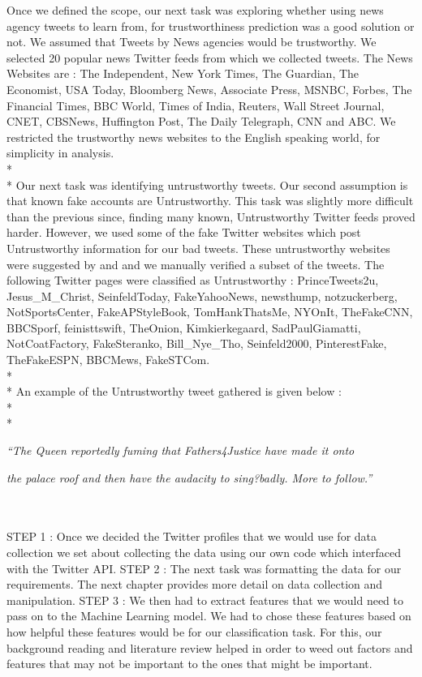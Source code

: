 Once we defined the scope, our next task was exploring whether using news agency tweets to learn from, for trustworthiness prediction was a good solution or not. 
We assumed that Tweets by News agencies would be trustworthy. We selected 20 popular news Twitter feeds from which we collected tweets. The News Websites are : The Independent, New York Times, The Guardian, The Economist, USA Today, Bloomberg News, Associate Press, MSNBC, Forbes, The Financial Times, BBC World, Times of India, Reuters, Wall Street Journal, CNET, CBSNews, Huffington Post, The Daily Telegraph, CNN and ABC. We restricted the trustworthy news websites to the English speaking world, for simplicity in analysis.\\*\\*
Our next task was identifying untrustworthy tweets.  Our second assumption is that known fake accounts are Untrustworthy. This task was slightly more difficult than the previous since, finding many known, Untrustworthy Twitter feeds proved harder. However, we used some of the fake Twitter websites which post Untrustworthy information for our bad tweets. These untrustworthy websites were suggested by \cite{23} and \cite{24} and we manually verified a subset of the tweets. The following Twitter pages were classified as Untrustworthy : PrinceTweets2u, Jesus\_M\_Christ, SeinfeldToday, FakeYahooNews, newsthump, notzuckerberg, NotSportsCenter, FakeAPStyleBook, TomHankThatsMe, NYOnIt, TheFakeCNN, BBCSporf, feinisttswift, TheOnion, Kimkierkegaard, SadPaulGiamatti, NotCoatFactory, FakeSteranko, Bill\_Nye\_Tho, Seinfeld2000, PinterestFake, TheFakeESPN, BBCMews, FakeSTCom. \\*\\* An example of the Untrustworthy tweet gathered is given below : \\*\\*
\centerline{\textit{``The Queen reportedly fuming that Fathers4Justice have made it onto}} 
\centerline{\textit{the palace roof and then have the audacity to sing?badly. More to follow.''}}\leavevmode \\\\
STEP 1 : Once we decided the Twitter profiles that we would use for data collection we set about collecting the data using our own code which interfaced with the Twitter API. 
STEP 2 : The next task was formatting the data for our requirements. The next chapter provides more detail on data collection and manipulation. 
STEP 3 : We then had to extract features that we would need to pass on to the Machine Learning model. We had to chose these features based on how helpful these features would be for our classification task. For this, our background reading and literature review helped in order to weed out factors and features that may not be important to the ones that might be important.
